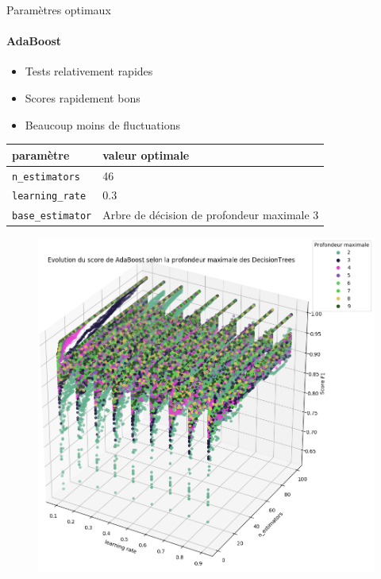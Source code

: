 \documentclass[usenames,dvipsnames]{beamer}
\begin{document}
\begin{frame}{Paramètres optimaux}
\framesubtitle{AdaBoost}

\begin{itemize}
\item Tests relativement rapides
\item Scores rapidement bons
\item Beaucoup moins de fluctuations
\end{itemize}

\begin{table}
\centering
\begin{tabular}{l l}
paramètre & valeur optimale \\
\hline
\texttt{n\_estimators} & 46\\
\texttt{learning\_rate} & 0.3 \\
\texttt{base\_estimator} & Arbre de décision de profondeur maximale 3\\
\end{tabular}
\end{table}

\end{frame}

\begin{frame}
\begin{figure}
\centering
\includegraphics[width=.7\textwidth]{img/adaboost_depth.png}
\end{figure}
\end{frame}
\end{document}
